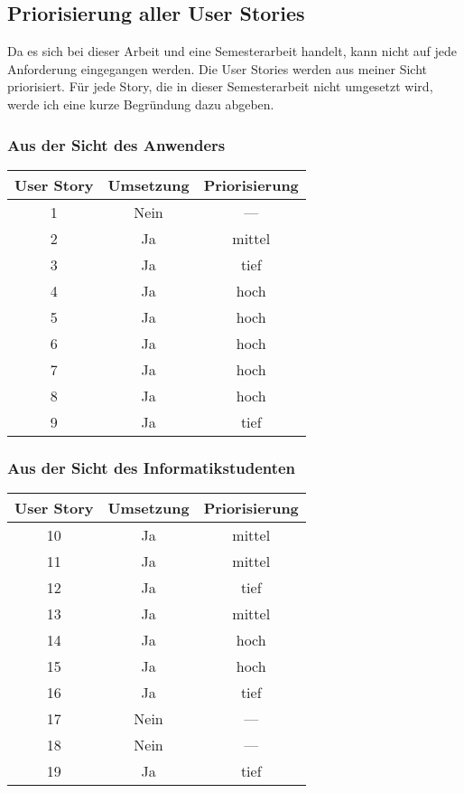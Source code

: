 \documentclass[listof=totocnumbered, bibliography=totocnumbered]{scrreprt}
\begin{document}
  \subsection{Priorisierung aller User Stories}
  
  Da es sich bei dieser Arbeit und eine Semesterarbeit handelt, kann nicht auf
  jede Anforderung eingegangen werden. Die User Stories werden aus meiner Sicht
  priorisiert. Für jede Story, die in dieser Semesterarbeit nicht umgesetzt
  wird, werde ich eine kurze Begründung dazu abgeben.
  
  \subsubsection{Aus der Sicht des Anwenders}
  
  \begin{tabular}{ccc}
    \toprule
    User Story & Umsetzung & Priorisierung \\
    \midrule
    1 & Nein & --- \\
    2 & Ja & mittel \\
    3 & Ja & tief \\
    4 & Ja & hoch \\
    5 & Ja & hoch \\
    6 & Ja & hoch \\
    7 & Ja & hoch \\
    8 & Ja & hoch \\
    9 & Ja & tief \\
    \bottomrule
  \end{tabular}
  
  \subsubsection{Aus der Sicht des Informatikstudenten}
  
  \begin{tabular}{ccc}
    \toprule
    User Story & Umsetzung & Priorisierung \\
    \midrule
    10 & Ja & mittel \\
    11 & Ja & mittel \\
    12 & Ja & tief \\
    13 & Ja & mittel \\
    14 & Ja & hoch \\
    15 & Ja & hoch \\
    16 & Ja & tief \\
    17 & Nein & --- \\
    18 & Nein & --- \\
    19 & Ja & tief \\
    \bottomrule
  \end{tabular}
  
\end{document}
